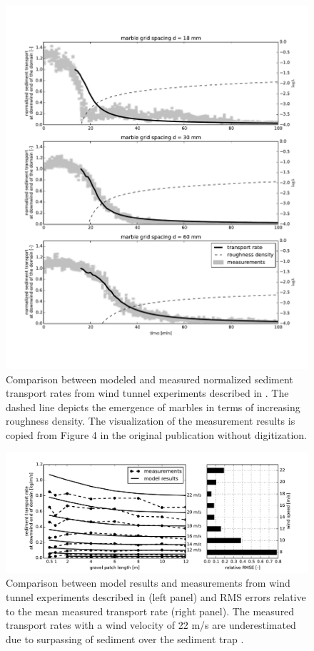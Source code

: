 \begin{figure}
  \centering
  \includegraphics[width=\columnwidth]{../Figures/nickling1995_py}
  \caption{Comparison between modeled and measured normalized sediment
    transport rates from wind tunnel experiments described in
    \citet{Nickling1995}. The dashed line depicts the emergence of
    marbles in terms of increasing roughness density. The
    visualization of the measurement results is copied from Figure 4
    in the original publication without digitization.}
  \label{fig:nickling1995}
\end{figure}

\begin{figure}
  \centering
  \includegraphics[width=\columnwidth]{../Figures/dong2004_py}
  \caption{Comparison between model results and measurements from wind
    tunnel experiments described in \citet{Dong2004b} (left panel) and
    RMS errors relative to the mean measured transport rate (right
    panel). The measured transport rates with a wind velocity of 22
    m/s are underestimated due to surpassing of sediment over the
    sediment trap \citep{Dong2004b}.}
  \label{fig:dong2004}
\end{figure}

